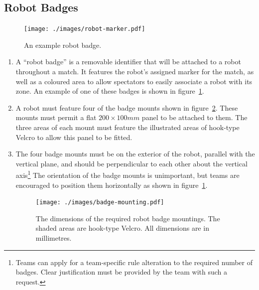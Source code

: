 \subsection{Robot Badges}
\label{sec:robot-badges}

\begin{figure}
  \centering
  \texttt{[image: ./images/robot-marker.pdf]}
  \caption{An example robot badge.}
  \label{fig:example-badge}
\end{figure}

\begin{enumerate}
\item A ``robot badge'' is a removable identifier that will be attached to a robot throughout a match.  It features the robot's assigned marker for the match, as well as a coloured area to allow spectators to easily associate a robot with its zone.  An example of one of these badges is shown in figure~\ref{fig:example-badge}.

\item A robot must feature four of the badge mounts shown in figure~\ref{fig:badge-mounting}.  These mounts must permit a flat $200 \times 100mm$ panel to be attached to them.  The three areas of each mount must feature the illustrated areas of hook-type Velcro to allow this panel to be fitted.

\item The four badge mounts must be on the exterior of the robot, parallel with the vertical plane, and should be perpendicular to each other about the vertical axis\footnote{Teams can apply for a team-specific rule alteration to the required number of badges.  Clear justification must be provided by the team with such a request.}  The orientation of the badge mounts is unimportant, but teams are encouraged to position them horizontally as shown in figure~\ref{fig:example-badge}.

  \begin{figure}
    \centering
    \texttt{[image: ./images/badge-mounting.pdf]}
    \caption{The dimensions of the required robot badge mountings.  The shaded areas are hook-type Velcro.  All dimensions are in millimetres.}
    \label{fig:badge-mounting}
  \end{figure}
\end{enumerate}

